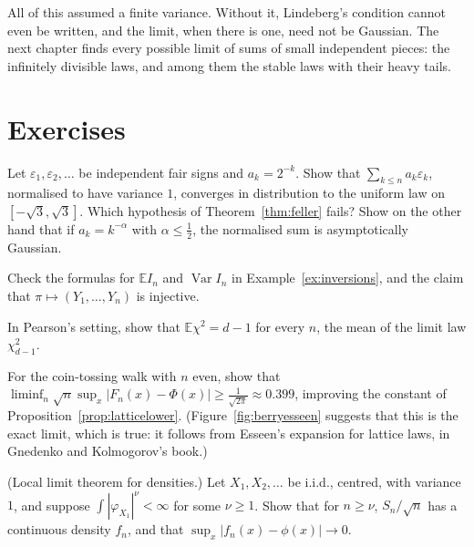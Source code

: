 All of this assumed a finite variance. Without it, Lindeberg's condition cannot even be written, and the limit, when there is one, need not be
Gaussian. The next chapter finds every possible limit of sums of small independent pieces: the infinitely divisible laws, and among them the stable
laws with their heavy tails.

\section{Exercises}

\begin{exercise}[$\star$]\label{ex:fellercounter}
Let $\varepsilon_1,\varepsilon_2,\dots$ be independent fair signs and $a_k=2^{-k}$. Show that $\sum_{k\le n}a_k\varepsilon_k$, normalised to have variance $1$,
converges in distribution to the uniform law on $[-\sqrt3,\sqrt3]$. Which hypothesis of Theorem~\ref{thm:feller} fails? Show on the other hand
that if $a_k=k^{-\alpha}$ with $\alpha\le\frac12$, the normalised sum is asymptotically Gaussian.
\end{exercise}

\begin{exercise}[$\star$]\label{ex:inversionsvar}
Check the formulas for $\mathbb EI_n$ and $\operatorname{Var}I_n$ in Example~\ref{ex:inversions}, and the claim that $\pi\mapsto(Y_1,\dots,Y_n)$ is injective.
\end{exercise}

\begin{exercise}[$\star$]\label{ex:chisqmean}
In Pearson's setting, show that $\mathbb E\chi^2=d-1$ for every $n$, the mean of the limit law $\chi^2_{d-1}$.
\end{exercise}

\begin{exercise}[$\star\star$]\label{ex:binomialsharp}
For the coin-tossing walk with $n$ even, show that $\liminf_n\sqrt n\sup_x|F_n(x)-\Phi(x)|\ge\frac1{\sqrt{2\pi}}\approx0.399$, improving the
constant of Proposition~\ref{prop:latticelower}. (Figure~\ref{fig:berryesseen} suggests that this is the exact limit, which is true: it follows from Esseen's
expansion for lattice laws, in Gnedenko and Kolmogorov's book.)
\end{exercise}

\begin{exercise}[$\star\star$]\label{ex:lltdensity}
(Local limit theorem for densities.) Let $X_1,X_2,\dots$ be i.i.d., centred, with variance $1$, and suppose $\int|\varphi_{X_1}|^\nu<\infty$ for some
$\nu\ge1$. Show that for $n\ge\nu$, $S_n/\sqrt n$ has a continuous density $f_n$, and that $\sup_x|f_n(x)-\phi(x)|\to0$.
\end{exercise}

